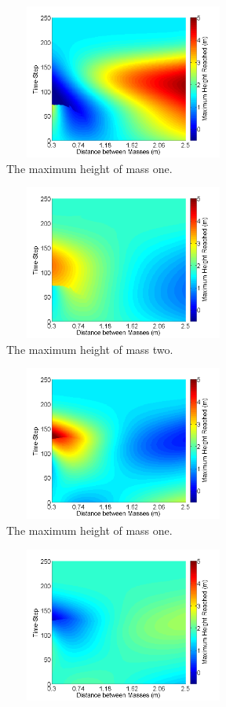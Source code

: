 \begin{figure}[H]
	\centering
    \begin{subfigure}{0.45\textwidth}
		\includegraphics[width=3.1in, height=2in]{Hm1on_m1.png}
    	\caption{The maximum height of mass one.}\label{fig:m1upm1on}
    \end{subfigure}\hfill
	\begin{subfigure}{0.45\textwidth}
		\includegraphics[width=3.1in, height=2in]{Hm1on_m2.png}
    	\caption{The maximum height of mass two.}\label{fig:m2upm1on}
    \end{subfigure}\hfill
    \begin{subfigure}{0.45\textwidth}
		\includegraphics[width=3.1in, height=2in]{Hm2on_m1.png}
    	\caption{The maximum height of mass one.}\label{fig:m1upm2on}
    \end{subfigure}\hfill
	\begin{subfigure}{0.45\textwidth}
		\includegraphics[width=3.1in, height=2in]{Hm2on_m2.png}

\end{subfigure}
\end{figure}

